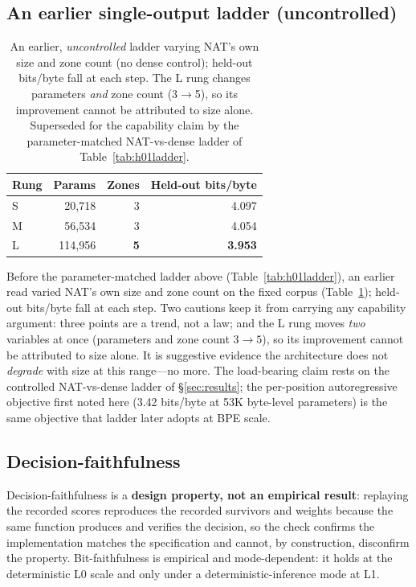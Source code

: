\documentclass[11pt]{article}
\begin{document}
\subsection{An earlier single-output ladder (uncontrolled)}
\begin{table}[h]\centering\small
\begin{tabular}{@{}lrrr@{}}
\toprule
Rung & Params & Zones & Held-out bits/byte \\
\midrule
S & 20{,}718 & 3 & 4.097 \\
M & 56{,}534 & 3 & 4.054 \\
L & 114{,}956 & \textbf{5} & \textbf{3.953} \\
\bottomrule
\end{tabular}
\caption{An earlier, \emph{uncontrolled} ladder varying NAT's own size and zone count (no dense
control); held-out bits/byte fall at each step. The L rung changes parameters \emph{and} zone count
(3$\to$5), so its improvement cannot be attributed to size alone. Superseded for the capability claim
by the parameter-matched NAT-vs-dense ladder of Table~\ref{tab:h01ladder}.}
\label{tab:ladder}
\end{table}
Before the parameter-matched ladder above (Table~\ref{tab:h01ladder}), an earlier read varied NAT's
own size and zone count on the fixed corpus (Table~\ref{tab:ladder}); held-out bits/byte fall at each
step. Two cautions keep it from carrying any capability argument: three points are a trend, not a
law; and the L rung moves \emph{two} variables at once (parameters and zone count $3\to5$), so its
improvement cannot be attributed to size alone. It is suggestive evidence the architecture does not
\emph{degrade} with size at this range---no more. The load-bearing claim rests on the controlled
NAT-vs-dense ladder of \S\ref{sec:results}; the per-position autoregressive objective first noted
here (3.42 bits/byte at 53K byte-level parameters) is the same objective that ladder later adopts at
BPE scale.

\subsection{Decision-faithfulness}
Decision-faithfulness is a \textbf{design property, not an empirical result}: replaying the recorded
scores reproduces the recorded survivors and weights because the same function produces and verifies
the decision, so the check confirms the implementation matches the specification and cannot, by
construction, disconfirm the property. Bit-faithfulness is empirical and mode-dependent: it holds at
the deterministic L0 scale and only under a deterministic-inference mode at L1.
\end{document}
